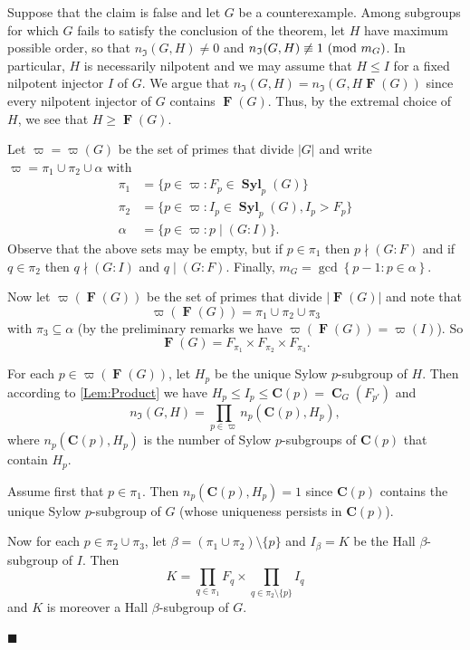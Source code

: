 \documentclass[a4paper,12pt,reqno]{amsart}
\numberwithin{equation}{section}
\DeclareMathOperator{\fitt}{\mathbf{F}}
\DeclareMathOperator{\cent}{\mathbf{C}}
\DeclareMathOperator{\syl}{\mathbf{Syl}}
\newcommand{\card}[1]{\left\lvert{#1}\right\rvert}
\renewcommand{\leq}{\leqslant}
\renewcommand{\geq}{\geqslant}
\newcommand{\md}[1]{\,\left(\textnormal{mod}\ #1\right)}
\newenvironment{proofofA}{{\bf {Proof of Theorem \ref{Thm:A}.} }}{\hfill $\blacksquare$ \\}
\def\C_p{{\mathbf{C}(p)}}
\begin{document}
\begin{proofofA}
Suppose that the claim is false and let $G$ be a counterexample.
Among subgroups for which $G$ fails to satisfy the conclusion of the theorem,
let $H$ have maximum possible order, 
so that $n_\mathfrak{I}(G, H) \neq 0$ 
and $n_\mathfrak{I}(G, H) \not\equiv 1\md{m_G}$.
In particular, $H$ is necessarily nilpotent and we may assume that $H \leq I$ 
for a fixed nilpotent injector $I$ of $G$. 
We argue that $n_\mathfrak{I}(G, H) = n_\mathfrak{I}(G, H \fitt(G))$
since every nilpotent injector of $G$ contains $\fitt(G)$.
Thus, by the extremal choice of $H$, we see that $H \geq \fitt(G)$.

Let $\varpi = \varpi(G)$ be the set of primes that divide $\card{G}$ and write 
$\varpi= \pi_1 \cup \pi_2 \cup \alpha$ with 
\begin{align*}
\pi_1  &= \{ p \in \varpi  : F_p \in \syl_p(G) \}\\
\pi_2  &= \{ p \in \varpi : I_p \in \syl_p(G), I_p > F_p \}\\
\alpha &= \{ p \in \varpi : p \mid (G:I)\}.  
\end{align*}
Observe that the above sets may be empty, 
but if $p \in \pi_1$ then $p \nmid (G : F)$  
and if $q \in \pi_2$ then $q \nmid (G : I)$ and $q \mid (G : F)$. 
Finally, $m_G =  \gcd\left\{ p - 1 : p \in \alpha \right\}$. 
		
Now let $\varpi(\fitt(G))$ be the set of primes that divide $\card{\fitt(G)}$ 
and note that 
\[
\varpi(\fitt(G))= \pi_1 \cup \pi_2 \cup \pi_3
\]
with $\pi_3 \subseteq \alpha$ 
(by the preliminary remarks we have $\varpi(\fitt(G)) = \varpi(I)$). 
So 
\[
\fitt(G) = F_{\pi_1} \times F_{\pi_2} \times F_{\pi_3}.
\]
		
For each $p \in \varpi(\fitt(G))$, 
let $H_p$ be the unique Sylow $p$-subgroup of $H$. Then according to \autoref{Lem:Product} we have  $H_p \leq I_p \leq \C_p = \cent_G(F_{p'})$ and 
\[
n_\mathfrak{I}(G, H) = \prod_{p \in \varpi} n_p(\C_p, H_p),
\]
where  $n_p(\C_p, H_p)$ is the number of Sylow $p$-subgroups of $\C_p$ that contain $H_p$.
		
Assume  first that  $p \in \pi_1$. 
Then $n_p(\C_p, H_p)= 1$ 
since $\C_p$ contains the unique Sylow $p$-subgroup of $G$
(whose uniqueness persists in $\C_p$).
		
Now for each $p \in \pi_2 \cup \pi_3$, 
let $\beta = (\pi_1 \cup \pi_2 ) \setminus \{ p\}$ 
and $I_{\beta}= K$ be the Hall $\beta$-subgroup of $I$. 
Then 
\[
K = \prod_{q \in \pi_1} F_q \times \prod_{q \in \pi_2 \setminus \{p\} } I_q
\]
and $K$ is moreover a Hall $\beta$-subgroup of $G$.
		

\end{proofofA}
\end{document}
